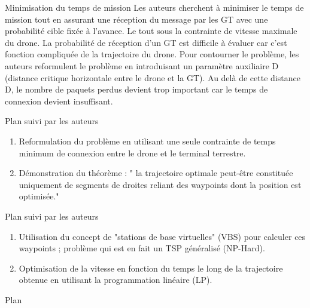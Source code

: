 \begin{frame}{Minimisation du temps de mission}
Les auteurs cherchent à minimiser le temps de mission tout en assurant une réception du message par les GT avec une probabilité cible fixée à l'avance. Le tout sous la contrainte de vitesse maximale du drone. La probabilité de réception d'un GT est difficile à évaluer car c'est fonction compliquée de la trajectoire du drone. Pour contourner le problème, les auteurs reformulent le problème en introduisant un paramètre auxiliaire D (distance critique horizontale entre le drone et la GT). Au delà de cette distance D, le nombre de paquets perdus devient trop important car le temps de connexion devient insuffisant. 


\end{frame}


\newcommand{\asuivre}{\setcounter{sauvegardeenumi}{\theenumi}}
\newcommand{\suite}{\setcounter{enumi}{\thesauvegardeenumi}}

\begin{frame}{Plan suivi par les auteurs}

\begin{enumerate}
	
	\item Reformulation du problème en utilisant une seule contrainte
	de temps minimum de connexion entre le drone et le terminal terrestre.	
	\item Démonstration du théorème : " la trajectoire optimale
	peut-être constituée uniquement de segments de droites reliant des
	waypoints dont la position est optimisée."

	
\end{enumerate}
\asuivre
\end{frame}

\begin{frame}{Plan suivi par les auteurs}
 
\begin{enumerate}
	\suite
	\item Utilisation du concept de "stations de base virtuelles" (VBS) pour calculer ces waypoints ;  problème qui est en fait un TSP généralisé (NP-Hard).

	\item Optimisation de la vitesse en fonction du temps le long de la trajectoire obtenue
	en utilisant la programmation linéaire (LP).

\end{enumerate}

\end{frame}


\begin{frame}{Plan}
	\tableofcontents
\end{frame}